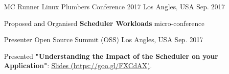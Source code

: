 

\begin{cventries}
  \cventry
    {MC Runner} %
    {Linux Plumbers Conference 2017} %
    {Los Angles, USA} %
    {Sep. 2017} %
    {
      \begin{cvitems} %
        \item {Proposed and Organised \textbf{Scheduler Workloads} micro-conference}
      \end{cvitems}
    }

  \cventry
    {Presenter} %
    {Open Source Summit (OSS)} %
    {Los Angles, USA} %
    {Sep. 2017} %
    {
      \begin{cvitems} %
        \item {Presented \textbf{"Understanding the Impact of the Scheduler on your Application"}:
		\href{http://schd.ws/hosted_files/ossna2017/2b/application_scheduler.pdf}{Slides (https://goo.gl/FXCdAX)}.}
      \end{cvitems}
    }
\end{cventries}
